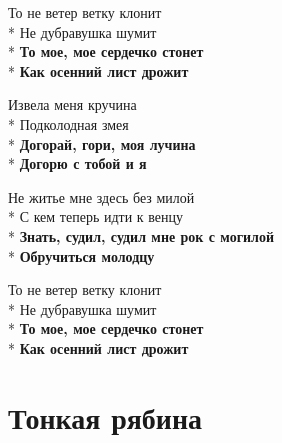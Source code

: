 \medskip

\begin{minipage}{\linewidth}
То не ветер ветку клонит\\*
Не дубравушка шумит\\*
\textbf{То мое, мое сердечко стонет}\\*
\textbf{Как осенний лист дрожит}\\
\end{minipage}\par\medskip\nobreak

\medskip

\begin{minipage}{\linewidth}
Извела меня кручина\\*
Подколодная змея\\*
\textbf{Догорай, гори, моя лучина}\\*
\textbf{Догорю с тобой и я}\\
\end{minipage}\par\medskip\nobreak

\medskip

\begin{minipage}{\linewidth}
Не житье мне здесь без милой\\*
С кем теперь идти к венцу\\*
\textbf{Знать, судил, судил мне рок с могилой}\\*
\textbf{Обручиться молодцу}\\
\end{minipage}\par\medskip\nobreak

\medskip

\begin{minipage}{\linewidth}
То не ветер ветку клонит\\*
Не дубравушка шумит\\*
\textbf{То мое, мое сердечко стонет}\\*
\textbf{Как осенний лист дрожит}\\
\end{minipage}

\vspace{\fill}\newpage

\section{Тонкая рябина}
\label{song:Тонкая_рябина}

